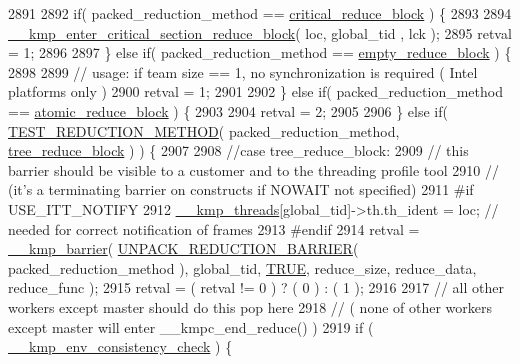\begin{DoxyCode}
{2891 
2892     \textcolor{keywordflow}{if}( packed\_reduction\_method == \hyperlink{kmp_8h_aef090e4cbee673db380b81f6deb8e306a2c5ad9d5d2b242bce894255d63ee550e}{critical\_reduce\_block} ) \{
2893 
2894         \hyperlink{kmp__csupport_8c_ad97140748ff9336db068d58f950a4850}{\_\_kmp\_enter\_critical\_section\_reduce\_block}( loc, global\_tid
      , lck );
2895         retval = 1;
2896 
2897     \} \textcolor{keywordflow}{else} \textcolor{keywordflow}{if}( packed\_reduction\_method == \hyperlink{kmp_8h_aef090e4cbee673db380b81f6deb8e306a28cf3671c5c01e773c7040204b6e8bb5}{empty\_reduce\_block} ) \{
2898 
2899         \textcolor{comment}{// usage: if team size == 1, no synchronization is required ( Intel platforms only )}
2900         retval = 1;
2901 
2902     \} \textcolor{keywordflow}{else} \textcolor{keywordflow}{if}( packed\_reduction\_method == \hyperlink{kmp_8h_aef090e4cbee673db380b81f6deb8e306ae4e1bd6637deb8f7d8098584a432aa0b}{atomic\_reduce\_block} ) \{
2903 
2904         retval = 2;
2905 
2906     \} \textcolor{keywordflow}{else} \textcolor{keywordflow}{if}( \hyperlink{kmp_8h_a8e31af7b50c35efd630502d8cbe89cd3}{TEST\_REDUCTION\_METHOD}( packed\_reduction\_method, 
      \hyperlink{kmp_8h_aef090e4cbee673db380b81f6deb8e306a7e21547b06d81d12a9b3293f3059b973}{tree\_reduce\_block} ) ) \{
2907 
2908         \textcolor{comment}{//case tree\_reduce\_block:}
2909         \textcolor{comment}{// this barrier should be visible to a customer and to the threading profile tool}
2910         \textcolor{comment}{//              (it's a terminating barrier on constructs if NOWAIT not specified)}
2911 \textcolor{preprocessor}{#if USE\_ITT\_NOTIFY}
2912 \textcolor{preprocessor}{}        \hyperlink{kmp_8h_a8ba907eb5a2568ff55a49a1504cd3624}{\_\_kmp\_threads}[global\_tid]->th.th\_ident = loc; \textcolor{comment}{// needed for correct notification of
       frames}
2913 \textcolor{preprocessor}{#endif}
2914 \textcolor{preprocessor}{}        retval = \hyperlink{kmp_8h_a2db240b744f3af1eb8413df50dbe6118}{\_\_kmp\_barrier}( \hyperlink{kmp_8h_a1ccb73b52bdd6146311ed40707c69b9a}{UNPACK\_REDUCTION\_BARRIER}( 
      packed\_reduction\_method ), global\_tid, \hyperlink{kmp_8h_aa8cecfc5c5c054d2875c03e77b7be15d}{TRUE}, reduce\_size, reduce\_data, reduce\_func );
2915         retval = ( retval != 0 ) ? ( 0 ) : ( 1 );
2916 
2917         \textcolor{comment}{// all other workers except master should do this pop here}
2918         \textcolor{comment}{//     ( none of other workers except master will enter \_\_kmpc\_end\_reduce() )}
2919         \textcolor{keywordflow}{if} ( \hyperlink{kmp_8h_ab4062d4f566c901230e51490a8819ba0}{\_\_kmp\_env\_consistency\_check} ) \{
}
\end{DoxyCode}
